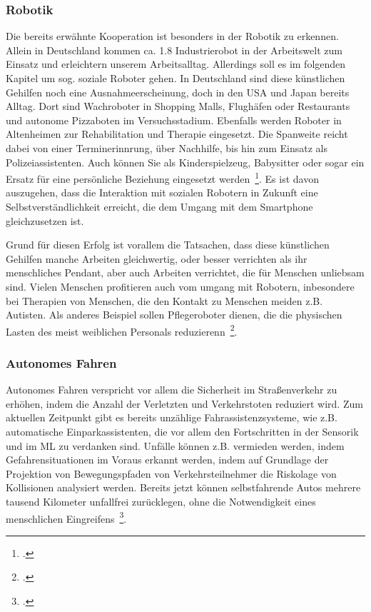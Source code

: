 \subsubsection{Robotik}
Die bereits erwähnte Kooperation ist besonders in der Robotik zu erkennen. Allein in Deutschland kommen ca. 1.8 Industrierobot in der Arbeitswelt zum Einsatz und erleichtern
unserem Arbeitsalltag. Allerdings soll es im folgenden Kapitel um sog. soziale Roboter gehen. In Deutschland sind diese künstlichen Gehilfen noch eine Ausnahmeerscheinung,
doch in den USA und Japan bereits Alltag. Dort sind Wachroboter in Shopping Malls, Flughäfen oder Restaurants und autonome Pizzaboten im Versuchsstadium. Ebenfalls werden Roboter in 
Altenheimen zur Rehabilitation und Therapie eingesetzt. Die Spanweite reicht dabei von einer Terminerinnrung, über Nachhilfe, bis hin zum Einsatz als Polizeiassistenten.
Auch können Sie als Kinderspielzeug, Babysitter oder sogar ein Ersatz für eine persönliche Beziehung eingesetzt werden~\footcite[\vglf][]{Heinrichs.2022}.
Es ist davon auszugehen, dass die Interaktion mit sozialen Robotern in Zukunft eine Selbstverständlichkeit erreicht, die dem Umgang mit dem Smartphone gleichzusetzen ist.

Grund für diesen Erfolg ist vorallem die Tatsachen, dass diese künstlichen Gehilfen manche Arbeiten gleichwertig, oder besser verrichten als ihr menschliches Pendant, aber auch
Arbeiten verrichtet, die für Menschen unliebsam sind. 
Vielen Menschen profitieren auch vom umgang mit Robotern, inbesondere bei Therapien von Menschen, die den Kontakt zu Menschen meiden z.B. Autisten. Als anderes Beispiel sollen 
Pflegeroboter dienen, die die physischen Lasten des meist weiblichen Personals reduzierenn~\footcite[\vglf][]{Heinrichs.2022}.

\subsubsection{Autonomes Fahren}
Autonomes Fahren verspricht vor allem die Sicherheit im Straßenverkehr zu erhöhen, indem die Anzahl der Verletzten und Verkehrstoten reduziert wird. Zum aktuellen Zeitpunkt
gibt es bereits unzählige Fahrassistenzsysteme, wie z.B. automatische Einparkassistenten, die vor allem den Fortschritten in der Sensorik und im \ac{ML} zu verdanken sind.
Unfälle können z.B. vermieden werden, indem Gefahrensituationen im Voraus erkannt werden, indem auf Grundlage der Projektion von Bewegungspfaden von Verkehrsteilnehmer die Riskolage
von Kollisionen analysiert werden.
Bereits jetzt können selbstfahrende Autos mehrere tausend Kilometer unfallfrei zurücklegen, ohne die Notwendigkeit eines menschlichen Eingreifens~\footcite[\vglf][]{Scherk.2017}.

